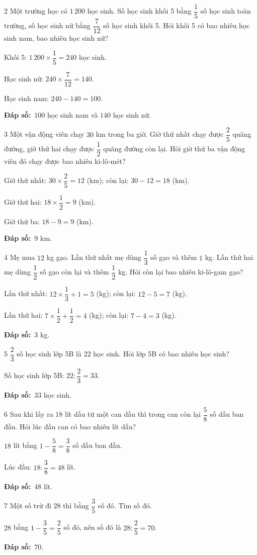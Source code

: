 \documentclass[11pt]{article}
\newif\ifsol \solfalse
\providecommand{\AnsWord}{Đáp số}
\newcommand{\dapso}[1]{\par\textbf{\AnsWord:}\ #1}
\newcommand{\probsol}[1]{%
  \begin{lrbox}{\solmeasure}\begin{minipage}{\dimexpr\linewidth-24pt\relax}#1\end{minipage}\end{lrbox}%
  \ifsol
    \begin{solbox}#1\end{solbox}%
  \else
    \setlength{\solht}{\dimexpr\ht\solmeasure+\dp\solmeasure+0.85cm\relax}%
    \ifdim\solht<1.35cm\setlength{\solht}{1.35cm}\fi
    \begin{tcolorbox}[colback=white,colframe=Line,boxrule=0.8pt,arc=5pt,
      left=8pt,right=8pt,top=4pt,bottom=4pt,height=\solht]{\footnotesize\color{Slate}\itshape\WorkWord}\end{tcolorbox}%
  \fi}
\newcommand{\gap}{\vspace{0.3cm}}
\def\WorkWord{Bài làm:}
\def\AnsWord{Đáp số}
\begin{document}
\gap
\begin{probbox}{2}{\relax}
Một trường học có $1\,200$ học sinh. Số học sinh khối 5 bằng $\dfrac15$ số học sinh toàn trường, số học sinh nữ bằng $\dfrac7{12}$ số học sinh khối 5. Hỏi khối 5 có bao nhiêu học sinh nam, bao nhiêu học sinh nữ?
\end{probbox}
\probsol{
Khối 5: $1\,200\times\dfrac15=240$ học sinh.\par Học sinh nữ: $240\times\dfrac7{12}=140$.\par Học sinh nam: $240-140=100$.
\dapso{$100$ học sinh nam và $140$ học sinh nữ.}}
\gap
\begin{probbox}{3}{\relax}
Một vận động viên chạy $30$ km trong ba giờ. Giờ thứ nhất chạy được $\dfrac25$ quãng đường, giờ thứ hai chạy được $\dfrac12$ quãng đường còn lại. Hỏi giờ thứ ba vận động viên đó chạy được bao nhiêu ki-lô-mét?
\end{probbox}
\probsol{
Giờ thứ nhất: $30\times\dfrac25=12$ (km); còn lại: $30-12=18$ (km).\par
Giờ thứ hai: $18\times\dfrac12=9$ (km).\par Giờ thứ ba: $18-9=9$ (km).
\dapso{$9$ km.}}
\gap
\begin{probbox}{4}{\relax}
Mẹ mua $12$ kg gạo. Lần thứ nhất mẹ dùng $\dfrac13$ số gạo và thêm $1$ kg. Lần thứ hai mẹ dùng $\dfrac12$ số gạo còn lại và thêm $\dfrac12$ kg. Hỏi còn lại bao nhiêu ki-lô-gam gạo?
\end{probbox}
\probsol{
Lần thứ nhất: $12\times\dfrac13+1=5$ (kg); còn lại: $12-5=7$ (kg).\par
Lần thứ hai: $7\times\dfrac12+\dfrac12=4$ (kg); còn lại: $7-4=3$ (kg).
\dapso{$3$ kg.}}
\gap
\begin{probbox}{5}{\relax}
$\dfrac23$ số học sinh lớp 5B là $22$ học sinh. Hỏi lớp 5B có bao nhiêu học sinh?
\end{probbox}
\probsol{
Số học sinh lớp 5B: $22:\dfrac23=33$.
\dapso{$33$ học sinh.}}
\gap
\begin{probbox}{6}{\relax}
Sau khi lấy ra $18$ lít dầu từ một can dầu thì trong can còn lại $\dfrac58$ số dầu ban đầu. Hỏi lúc đầu can có bao nhiêu lít dầu?
\end{probbox}
\probsol{
$18$ lít bằng $1-\dfrac58=\dfrac38$ số dầu ban đầu.\par Lúc đầu: $18:\dfrac38=48$ lít.
\dapso{$48$ lít.}}
\gap
\begin{probbox}{7}{\relax}
Một số trừ đi $28$ thì bằng $\dfrac35$ số đó. Tìm số đó.
\end{probbox}
\probsol{
$28$ bằng $1-\dfrac35=\dfrac25$ số đó, nên số đó là $28:\dfrac25=70$.
\dapso{$70$.}}
\end{document}
